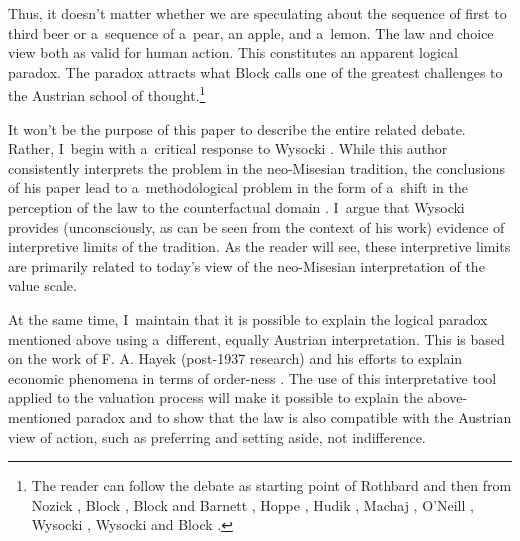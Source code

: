 Thus, it doesn't matter whether we are speculating about the sequence of first to third beer or a~sequence of a~pear, an apple, and a~lemon. The law and choice view both as valid for human action. This constitutes an apparent logical paradox. The paradox attracts what Block 
\parencite*[][]{} %
 calls one of the greatest challenges to the Austrian school of thought.\footnote{The reader can follow the debate as starting point of Rothbard 
\parencite*[][]{} %
 and then from Nozick 
\parencite*[][]{}, %
 Block 
\parencites*[][]{}[][]{}[][]{}, %
 Block and Barnett 
\parencite*[][]{}, %
 Hoppe 
\parencites*[][]{}[][]{}, %
 Hudik 
\parencite*[][]{}, %
 Machaj 
\parencite*[][]{}, %
 O'Neill 
\parencite*[][]{}, %
 Wysocki 
\parencites*[][]{}[][]{}, %
 Wysocki and Block 
\parencites*[][]{}[][]{}.%
}



It won't be the purpose of this paper to describe the entire related debate. Rather, I~begin with a~critical response to Wysocki 
\parencite*[][]{}. %
 While this author consistently interprets the problem in the neo-Misesian tradition, the conclusions of his paper lead to a~methodological problem in the form of a~shift in the perception of the law to the counterfactual domain 
\parencite[][pp.41–42]{}. %
 I~argue that Wysocki 
\parencite*[][]{} %
 provides (unconsciously, as can be seen from the context of his work) evidence of interpretive limits of the tradition. As the reader will see, these interpretive limits are primarily related to today's view of the neo-Misesian interpretation of the value scale.



At the same time, I~maintain that it is possible to explain the logical paradox mentioned above using a~different, equally Austrian interpretation. This is based on the work of F. A. Hayek (post-1937 research) and his efforts to explain economic phenomena in terms of order-ness 
\parencites[see e.g.,][]{}[][]{}. %
 The use of this interpretative tool applied to the valuation process will make it possible to explain the above-mentioned paradox and to show that the law is also compatible with the Austrian view of action, such as preferring and setting aside, not indifference.



